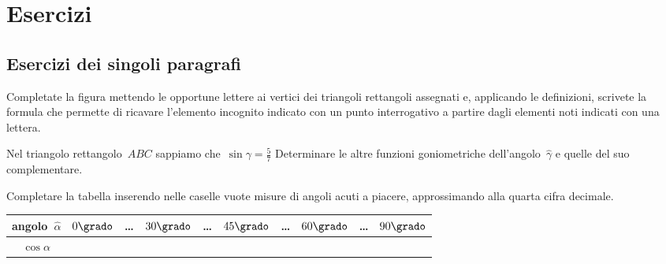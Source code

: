 

\section{Esercizi}
\subsection{Esercizi dei singoli paragrafi}

\begin{esercizio}
\label{ese:G.1}
Completate la figura mettendo le opportune lettere ai vertici dei triangoli 
rettangoli assegnati e, applicando le definizioni, scrivete la formula
che permette di ricavare l'elemento incognito indicato con un punto 
interrogativo a partire dagli elementi noti indicati con una lettera.
\begin{center}
\begin{inaccessibleblock}
 
\end{inaccessibleblock}
\end{center}
\end{esercizio}


\begin{esercizio}
\label{ese:G.2}
Nel triangolo rettangolo~$ABC$ sappiamo che~$\sin \gamma =\frac{5}{7}$
Determinare le altre funzioni goniometriche dell'angolo~$\hat{\gamma}$ e quelle 
del suo complementare.
\end{esercizio}


\begin{esercizio}
\label{ese:G.3}
Completare la tabella inserendo nelle caselle vuote misure di angoli acuti a 
piacere, approssimando alla quarta cifra decimale.
\begin{center}
\begin{tabular}{cccccccccc}
\toprule
angolo~$\hat{\alpha}$ & $0\grado$ & \ldots & $30\grado$ & \ldots & $45\grado$ & 
\ldots & $60\grado$ & \ldots & $90\grado$\\
\midrule
$\cos \alpha$ & & & & & & & & & \\
\bottomrule
\end{tabular}
\end{center}
\end{esercizio}

